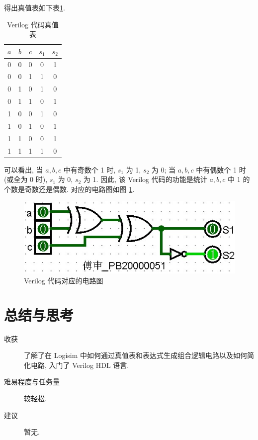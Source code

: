 \documentclass[UTF8,fontset=fandol]{ctexart}
\begin{document}
\begin{ExQuestions}
  得出真值表如下表\ref{Tab.1}.
  \begin{table}[!ht]
    \centering
    \label{Tab.1}
    \caption{Verilog 代码真值表}
    \begin{tabular}{ccc|cc} 
    \toprule
    $a$ & $b$ & $c$ & $s_1$ & $s_2$  \\ 
    \hline
    0   & 0   & 0   & 0     & 1      \\
    0   & 0   & 1   & 1     & 0      \\
    0   & 1   & 0   & 1     & 0      \\
    0   & 1   & 1   & 0     & 1      \\
    1   & 0   & 0   & 1     & 0      \\
    1   & 0   & 1   & 0     & 1      \\
    1   & 1   & 0   & 0     & 1      \\
    1   & 1   & 1   & 1     & 0      \\
    \bottomrule
    \end{tabular}
    \end{table}
    可以看出, 当 $a, b, c$ 中有奇数个 1 时, $s_1$ 为 1, $s_2$ 为 0; 当 $a, b, c$ 中有偶数个 1 时 (或全为 0 时), $s_1$ 为 0, $s_2$ 为 1. 因此, 该 Verilog 代码的功能是统计 $a, b, c$ 中 1 的个数是奇数还是偶数. 对应的电路图如图 \ref{Fig.8}.
    \begin{figure}[H]
      \centering
      \label{Fig.8}
      \includegraphics[width = .5\linewidth]{images/Fig.8.jpg}
      \caption{Verilog 代码对应的电路图}
    \end{figure}
\end{ExQuestions}
\section*{总结与思考}
\begin{description}
  \item[收获] 了解了在 Logisim 中如何通过真值表和表达式生成组合逻辑电路以及如何简化电路, 入门了 Verilog HDL 语言.
  \item[难易程度与任务量] 较轻松.
  \item[建议] 暂无. 
\end{description}
\end{document}
